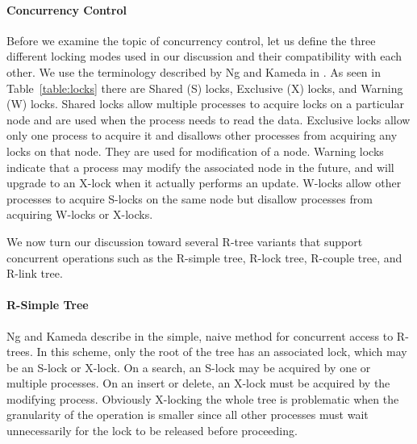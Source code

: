 \paragraph{Concurrency Control} 
Before we examine the topic of concurrency control, let us define the three
different locking modes used in our discussion and their compatibility with
each other. We use the terminology described by Ng and Kameda in 
\cite{ng1993concurrent}. As seen in Table~\ref{table:locks} there are Shared 
(S) locks, Exclusive (X) locks, and Warning (W) locks. Shared locks allow multiple 
processes to acquire locks on a particular node and are used when the process
needs to read the data. Exclusive locks allow only one process to acquire it
and disallows other processes from acquiring any locks on that node. They are 
used for modification of a node. Warning locks indicate that a process
may modify the associated node in the future, and will upgrade to an X-lock 
when it actually performs an update. W-locks allow other processes to acquire
S-locks on the same node but disallow processes from acquiring W-locks or X-locks.

\begin{table}[hb]
\end{table}
	
We now turn our discussion toward several R-tree variants that support concurrent 
operations such as the R-simple tree, R-lock tree, R-couple 
tree\cite{ng1993concurrent}, and R-link tree\cite{kornacker1995high, ng1994r}. 

\paragraph{R-Simple Tree} Ng and Kameda describe in \cite{ng1993concurrent}
the simple, naive method for concurrent access to R-trees. In this scheme, only 
the root of the tree has an associated lock, which may be an S-lock or X-lock. 
On a search, an S-lock may be acquired by one or 
multiple processes. On an insert or delete, an X-lock must be acquired by the 
modifying process. Obviously X-locking the whole tree is problematic when the 
granularity of the operation is smaller since all other processes must wait 
unnecessarily for the lock to be released before proceeding. 


